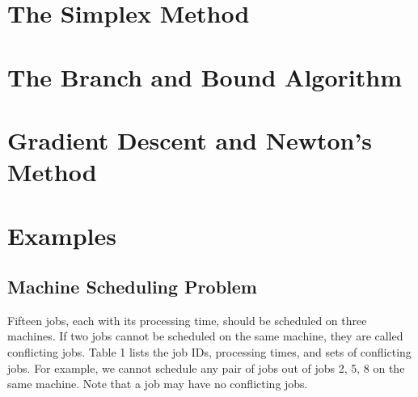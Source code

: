 \documentclass[letterpaper,10pt,english]{sphinxmanual}
\begin{document}
\section{The Simplex Method}
\label{\detokenize{operationsResearch/optimizationAlgorithms:the-simplex-method}}

\section{The Branch and Bound Algorithm}
\label{\detokenize{operationsResearch/optimizationAlgorithms:the-branch-and-bound-algorithm}}

\section{Gradient Descent and Newton’s Method}
\label{\detokenize{operationsResearch/optimizationAlgorithms:gradient-descent-and-newton-s-method}}

\section{Examples}
\label{\detokenize{operationsResearch/optimizationAlgorithms:examples}}

\subsection{Machine Scheduling Problem}
\label{\detokenize{operationsResearch/optimizationAlgorithms:machine-scheduling-problem}}
\sphinxAtStartPar
Fifteen jobs, each with its processing time, should be scheduled on three machines.
If two jobs cannot be scheduled on the same machine, they are called conflicting jobs.
Table 1 lists the job IDs, processing times, and sets of conflicting jobs.
For example, we cannot schedule any pair of jobs out of jobs 2, 5, 8 on the same machine.
Note that a job may have no conflicting jobs.
\end{document}
